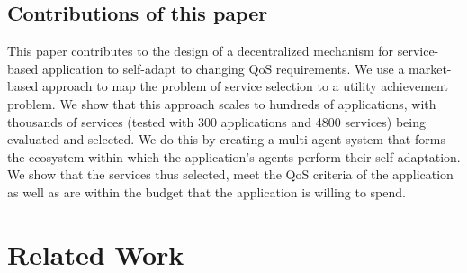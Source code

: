 \documentclass[10pt,journal,compsoc]{IEEEtran}
\begin{document}
\subsection{Contributions of this paper}
This paper contributes to the design of a decentralized mechanism for service-based application to self-adapt to changing QoS requirements. We use a market-based approach to map the problem of service selection to a utility achievement problem.  We show that this approach scales to hundreds of applications, with thousands of services (tested with 300 applications and 4800 services) being evaluated and selected. We do this by creating a multi-agent system that forms the ecosystem within which the application's agents perform their self-adaptation. We show that the services thus selected, meet the QoS criteria of the application as well as are within the budget that the application is willing to spend. 
  
\section{Related Work}
    
\end{document}
